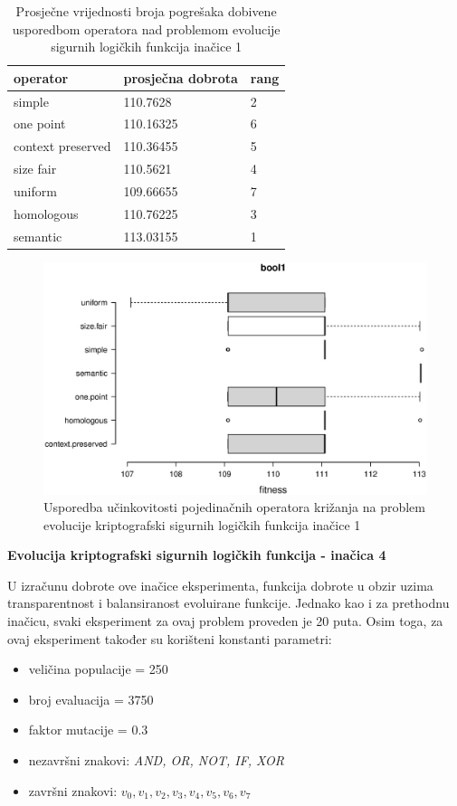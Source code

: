 \begin{table}[H]
 	\centering
\caption{Prosječne vrijednosti broja pogrešaka dobivene usporedbom operatora nad problemom evolucije sigurnih logičkih funkcija inačice 1}
    \begin{tabular}{| l | l | l |}
    \hline
    \textbf{operator} & \textbf{prosječna dobrota} & \textbf{rang}\\ \hline
    simple & 110.7628 & 2\\ \hline
    one point & 110.16325 & 6\\ \hline
    context preserved & 110.36455 & 5\\ \hline
    size fair & 110.5621 & 4\\ \hline
    uniform & 109.66655 & 7\\ \hline
    homologous & 110.76225 & 3\\ \hline
    semantic & 113.03155 & 1\\ \hline
    \end{tabular}
    
    
    \label{bool1table}
\end{table}

\begin{figure}[H]
	\centering
	\includegraphics[trim=0cm 4cm 0cm 0cm, scale=0.5]{./slike/boxPlots/bool1.eps}
	\caption{Usporedba učinkovitosti pojedinačnih operatora križanja na problem evolucije kriptografski sigurnih logičkih funkcija inačice 1}
	\label{bool1box}
\end{figure}


\textbf{Evolucija kriptografski sigurnih logičkih funkcija - inačica 4}

U izračunu dobrote ove inačice eksperimenta, funkcija dobrote u obzir uzima transparentnost i balansiranost evoluirane funkcije. Jednako kao i za prethodnu inačicu, svaki eksperiment za ovaj problem proveden je 20 puta. Osim toga, za  ovaj eksperiment također su korišteni konstanti parametri:
\begin{itemize}
\item{veličina populacije = 250}
\item{broj evaluacija = 3750}
\item{faktor mutacije = 0.3}
\item{nezavršni znakovi: \textit{AND, OR, NOT, IF, XOR}}
\item{završni znakovi: \textit{$v_0, v_1, v_2, v_3, v_4, v_5, v_6, v_7$}}
\end{itemize}

